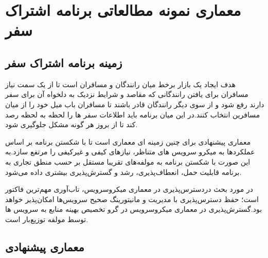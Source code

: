 \chapter{معماری نمونه مطالعاتی برنامه اشتراک سفر}

\section{زمینه برنامه اشتراک سفر}
هدف ایجاد یک بازار برخط میان رانندگان و مسافران است تا از یک سمت نیاز مسافران برای یافتن رانندگانی که مقاصد و شرایط نزدیک به دلخواه آن برای سفر دارند رفع شود و از سوی دیگر رانندگان قادر باشند تا مسافران باب میل خود را از میان مسافرین انتخاب کنند.در این میان برنامه باید اطلاعات سفر ها را لحظه به لحظه رصد کند تا از بروز هر گونه مشکل جلوگیری شود.

معماری پیشنهادی برای چنین زمینه ای معماری  است تا با شکستن برنامه بر اساس عملکرد‌ها به میکرو سرویس های متناظر، نیازهای کیفی و غیرکیفی را مرتفع سازد.به این صورت با شکستن برنامه به مولفه‌های تقریبا مستقل بر حسب منطق تجاری به برنامه قابلیت حمل، انعطاف‌پذیری، رشد و گسترش‌پذیری بیشتری داده می‌شود.

در مورد بحث دردسترس‌پذیری در معماری میکروسرویس، تاب‌‌آوری مهم‌ترین فاکتور است؛ حفظ دسترس‌پذیری با مدیریت و مانیتورینگ صحیح سرویس‌ها امکان‌پذیر خواهد بود.گسترش‌پذیری در معماری میکروسرویس در گرو تخصیص بهینه منابع به سرویس ها توسط مولفه توزیع‌بار است.

\section{معماری پیشنهادی}

